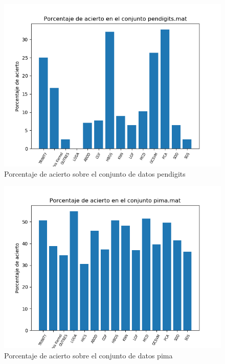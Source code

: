 \begin{figure}[H]
	\centering
	\label{pendigits_accuracy}
	\includegraphics[scale=0.7]{imagenes/imgs-exp1/accuracy/pendigits}
	\caption{Porcentaje de acierto sobre el conjunto de datos pendigits}
\end{figure}

\begin{figure}[H]
	\centering
	\label{pima_accuracy}
	\includegraphics[scale=0.7]{imagenes/imgs-exp1/accuracy/pima}
	\caption{Porcentaje de acierto sobre el conjunto de datos pima}
\end{figure}

